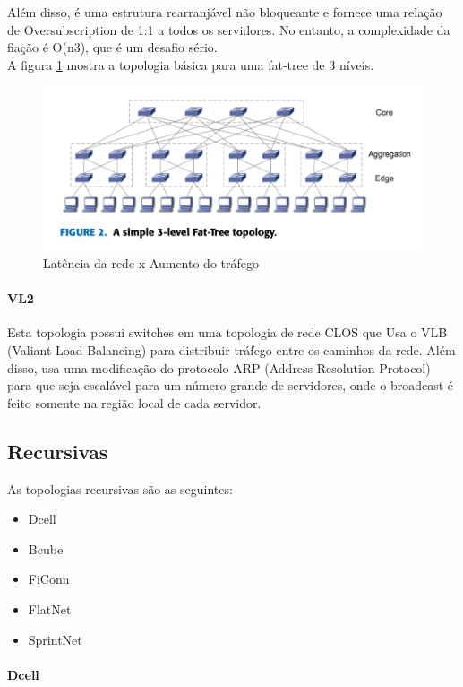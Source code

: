 \documentclass[12pt,a4paper]{report}
\begin{document}
Além disso, é uma estrutura rearranjável não bloqueante e fornece uma relação de Oversubscription de 1:1 a todos os servidores. No entanto, a complexidade da fiação é O(n3), que é um desafio sério.\\

A figura \ref{fat_tree} mostra a topologia básica para uma fat-tree de 3 níveis.\\

\begin{figure}[H]
\centering
\includegraphics[width=.8\textwidth]{imagens/fat_tree.png}
\caption{Latência da rede x Aumento do tráfego}
\label{fat_tree}
\end{figure}

\paragraph{VL2}
Esta topologia possui switches em uma topologia de rede CLOS que Usa o VLB (Valiant Load Balancing) para distribuir tráfego entre os caminhos da rede. Além disso, usa uma modificação do protocolo ARP (Address Resolution Protocol) para que seja escalável para um número grande de servidores, onde o broadcast é feito somente na região local de cada servidor.\\

\subsection{Recursivas}
As topologias recursivas são as seguintes:\\
\begin{itemize}
\item Dcell
\item Bcube
\item FiConn
\item FlatNet
\item SprintNet
\end{itemize}

\paragraph{Dcell}
\end{document}
